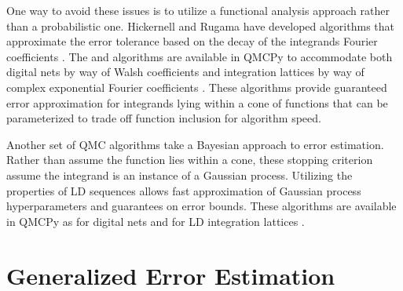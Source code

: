 \documentclass{article}
\begin{document}
One way to avoid these issues is to utilize a functional analysis approach rather than a probabilistic one. Hickernell and Rugama have developed algorithms that approximate the error tolerance based on the decay of the integrands Fourier coefficients \cite{adaptive_qmc}. The  and  algorithms are available in QMCPy to accommodate both digital nets by way of Walsh coefficients \cite{cubqmcsobol} and integration lattices by way of complex exponential Fourier coefficients \cite{cubqmclattice}. These algorithms provide guaranteed error approximation for integrands lying within a cone of functions that can be parameterized to trade off function inclusion for algorithm speed. 

Another set of QMC algorithms take a Bayesian approach to error estimation. Rather than assume the function lies within a cone, these stopping criterion assume the integrand is an instance of a Gaussian process. Utilizing the properties of LD sequences allows fast approximation of Gaussian process hyperparameters and guarantees on error bounds. These algorithms are available in QMCPy as  for digital nets  and  for LD integration lattices \cite{cubqmcbayeslattice}. 

\section{Generalized Error Estimation} \label{sec: Generalized Error Estimation}

\end{document}
